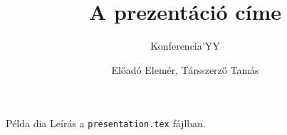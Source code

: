 \documentclass[t,aspectratio=169]{beamer}
\title{A prezentáció címe}
\subtitle{Konferencia'YY}
\author{Előadó Elemér, Társszerző Tamás}
\begin{document}
	{
		\begin{frame}
			\titlepage
		\end{frame}
	}
\addtocounter{framenumber}{-1}
  
\begin{frame}{Példa dia}
  Leírás a \texttt{presentation.tex} fájlban.
\end{frame}
\end{document}
